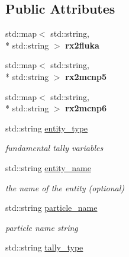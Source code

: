 \subsection*{Public Attributes}
\begin{DoxyCompactItemize}
\item 
\hypertarget{classpyne_1_1_tally_a451b6a2d7a0de5e54936f2274861cc0d}{std\+::map$<$ std\+::string, \\*
std\+::string $>$ {\bfseries rx2fluka}}\label{classpyne_1_1_tally_a451b6a2d7a0de5e54936f2274861cc0d}

\item 
\hypertarget{classpyne_1_1_tally_ae402f5aca5baea59ffc51f68e12e0d30}{std\+::map$<$ std\+::string, \\*
std\+::string $>$ {\bfseries rx2mcnp5}}\label{classpyne_1_1_tally_ae402f5aca5baea59ffc51f68e12e0d30}

\item 
\hypertarget{classpyne_1_1_tally_a6c2c0bad20d29a6b73110ae5610cd572}{std\+::map$<$ std\+::string, \\*
std\+::string $>$ {\bfseries rx2mcnp6}}\label{classpyne_1_1_tally_a6c2c0bad20d29a6b73110ae5610cd572}

\item 
std\+::string \hyperlink{classpyne_1_1_tally_a8b2e517c759ca71bc7b25c4de5a412f9}{entity\+\_\+type}
\begin{DoxyCompactList}\small\item\em fundamental tally variables \end{DoxyCompactList}\item 
\hypertarget{classpyne_1_1_tally_ac7892546a42be1385f0e805638a124b1}{std\+::string \hyperlink{classpyne_1_1_tally_ac7892546a42be1385f0e805638a124b1}{entity\+\_\+name}}\label{classpyne_1_1_tally_ac7892546a42be1385f0e805638a124b1}

\begin{DoxyCompactList}\small\item\em the name of the entity (optional) \end{DoxyCompactList}\item 
\hypertarget{classpyne_1_1_tally_af79d35607aeb81e366f76ab75e2bfda0}{std\+::string \hyperlink{classpyne_1_1_tally_af79d35607aeb81e366f76ab75e2bfda0}{particle\+\_\+name}}\label{classpyne_1_1_tally_af79d35607aeb81e366f76ab75e2bfda0}

\begin{DoxyCompactList}\small\item\em particle name string \end{DoxyCompactList}\item 
\hypertarget{classpyne_1_1_tally_ae5944106656a49e0f7f525e75acaa4b2}{std\+::string \hyperlink{classpyne_1_1_tally_ae5944106656a49e0f7f525e75acaa4b2}{tally\+\_\+type}}\label{classpyne_1_1_tally_ae5944106656a49e0f7f525e75acaa4b2}


\end{DoxyCompactItemize}
